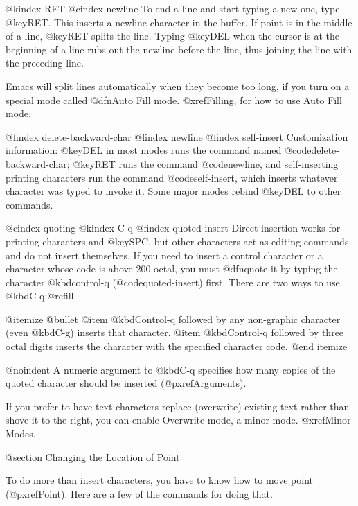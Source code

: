 {{{@kindex RET
@cindex newline
   To end a line and start typing a new one, type @key{RET}.  This inserts
a newline character in the buffer.  If point is in the middle of a line,
@key{RET} splits the line.  Typing @key{DEL} when the cursor is at the
beginning of a line rubs out the newline before the line, thus joining the
line with the preceding line.

  Emacs will split lines automatically when they become too long, if you
turn on a special mode called @dfn{Auto Fill} mode.  @xref{Filling}, for
how to use Auto Fill mode.

@findex delete-backward-char
@findex newline
@findex self-insert
  Customization information: @key{DEL} in most modes runs the command named
@code{delete-backward-char}; @key{RET} runs the command @code{newline}, and
self-inserting printing characters run the command @code{self-insert},
which inserts whatever character was typed to invoke it.  Some major modes
rebind @key{DEL} to other commands.

@cindex quoting
@kindex C-q
@findex quoted-insert
  Direct insertion works for printing characters and @key{SPC}, but other
characters act as editing commands and do not insert themselves.  If you
need to insert a control character or a character whose code is above 200
octal, you must @dfn{quote} it by typing the character @kbd{control-q}
(@code{quoted-insert}) first.  There are two ways to use @kbd{C-q}:@refill

@itemize @bullet
@item
@kbd{Control-q} followed by any non-graphic character (even @kbd{C-g})
inserts that character.
@item
@kbd{Control-q} followed by three octal digits inserts the character
with the specified character code.
@end itemize

@noindent
A numeric argument to @kbd{C-q} specifies how many copies of the
quoted character should be inserted (@pxref{Arguments}).

  If you prefer to have text characters replace (overwrite) existing
text rather than shove it to the right, you can enable Overwrite mode,
a minor mode.  @xref{Minor Modes}.

@section Changing the Location of Point

  To do more than insert characters, you have to know how to move
point (@pxref{Point}).  Here are a few of the commands for doing that.

}}}
